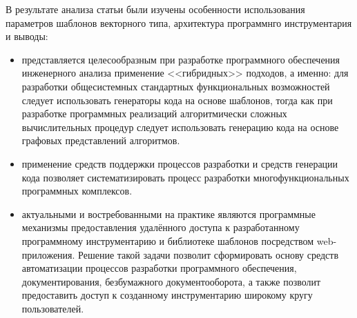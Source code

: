 \def\notedate{2022.10.02}
\def\currentauthor{Василян А.Р. (РК6-73Б)}

	
В результате анализа статьи \cite{Sokolov2019} были изучены особенности использования параметров шаблонов векторного типа, архитектура программнго инструментария и выводы:
\begin{itemize}
	\item представляется целесообразным при разработке программного обеспечения инженерного анализа применение <<гибридных>> подходов, а именно: для разработки общесистемных стандартных функциональных возможностей следует использовать генераторы кода на основе шаблонов, тогда как при разработке программных реализаций алгоритмически сложных вычислительных процедур следует использовать генерацию кода на основе графовых представлений алгоритмов.
	\item применение средств поддержки процессов разработки и средств генерации кода позволяет систематизировать процесс разработки многофункциональных программных комплексов.
	\item актуальными и востребованными на практике являются программные механизмы предоставления удалённого доступа к разработанному программному инструментарию и библиотеке шаблонов посредством web-приложения. Решение такой задачи позволит сформировать основу средств автоматизации процессов разработки программного обеспечения, документирования, безбумажного документооборота, а также позволит предоставить доступ к созданному инструментарию широкому кругу пользователей.
\end{itemize}

\noteattributes{}

